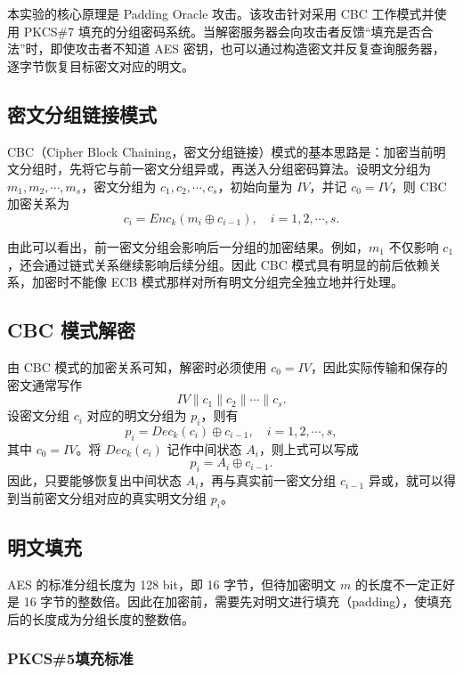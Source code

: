 本实验的核心原理是 Padding Oracle 攻击。该攻击针对采用 CBC 工作模式并使用 PKCS\#7 填充的分组密码系统。当解密服务器会向攻击者反馈“填充是否合法”时，即使攻击者不知道 AES 密钥，也可以通过构造密文并反复查询服务器，逐字节恢复目标密文对应的明文。

\subsection{密文分组链接模式}

CBC（Cipher Block Chaining，密文分组链接）模式的基本思路是：加密当前明文分组时，先将它与前一密文分组异或，再送入分组密码算法。设明文分组为 $m_1,m_2,\cdots,m_s$，密文分组为 $c_1,c_2,\cdots,c_s$，初始向量为 $IV$，并记 $c_0 = IV$，则 CBC 加密关系为
\[
    c_i = Enc_k(m_i \oplus c_{i-1}), \quad i = 1,2,\cdots,s.
\]

由此可以看出，前一密文分组会影响后一分组的加密结果。例如，$m_1$ 不仅影响 $c_1$，还会通过链式关系继续影响后续分组。因此 CBC 模式具有明显的前后依赖关系，加密时不能像 ECB 模式那样对所有明文分组完全独立地并行处理。

\subsection{CBC 模式解密}

由 CBC 模式的加密关系可知，解密时必须使用 $c_0 = IV$，因此实际传输和保存的密文通常写作
\[
    IV \parallel c_1 \parallel c_2 \parallel \cdots \parallel c_s.
\]
设密文分组 $c_i$ 对应的明文分组为 $p_i$，则有
\[
    p_i = Dec_k(c_i) \oplus c_{i-1}, \quad i = 1,2,\cdots,s,
\]
其中 $c_0 = IV$。将 $Dec_k(c_i)$ 记作中间状态 $A_i$，则上式可以写成
\begin{equation}
    p_i = A_i \oplus c_{i-1}.
\end{equation}
因此，只要能够恢复出中间状态 $A_i$，再与真实前一密文分组 $c_{i-1}$ 异或，就可以得到当前密文分组对应的真实明文分组 $p_i$。

\subsection{明文填充}

AES 的标准分组长度为 128 bit，即 16 字节，但待加密明文 $m$ 的长度不一定正好是 16 字节的整数倍。因此在加密前，需要先对明文进行填充（padding），使填充后的长度成为分组长度的整数倍。

\subsubsection{PKCS\#5填充标准}

